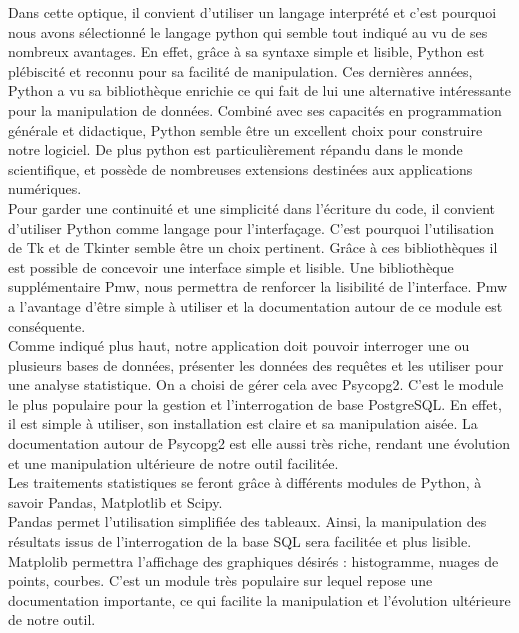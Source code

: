 \documentclass[a4paper]{report}
\begin{document}
Dans cette optique, il convient d’utiliser un langage interprété et c’est pourquoi nous avons sélectionné le langage python qui semble tout indiqué au vu de ses nombreux avantages. En effet, grâce à sa syntaxe simple et lisible, Python est plébiscité et reconnu pour sa facilité de manipulation. Ces dernières années, Python a vu sa bibliothèque enrichie ce qui fait de lui une alternative intéressante pour la manipulation de données. Combiné avec ses capacités en programmation générale et didactique, Python semble être un excellent choix pour construire notre logiciel. De plus python est particulièrement répandu dans le monde scientifique, et possède de nombreuses extensions destinées aux applications numériques.\\

Pour garder une continuité et une simplicité dans l'écriture du code, il convient d'utiliser Python comme langage pour l'interfaçage. C'est pourquoi l'utilisation de Tk et de Tkinter semble être un choix pertinent. Grâce à ces bibliothèques il est possible de concevoir une interface simple et lisible. Une bibliothèque supplémentaire Pmw, nous permettra de renforcer la lisibilité de l'interface. Pmw a l'avantage d'être simple à utiliser et la documentation autour de ce module est conséquente.\\

Comme indiqué plus haut, notre application doit pouvoir interroger une ou plusieurs bases de données, présenter les données des requêtes et les utiliser pour une analyse statistique. On a choisi de gérer cela avec Psycopg2. C'est le module le plus populaire pour la gestion et l'interrogation de base PostgreSQL. En effet, il est simple à utiliser, son installation est claire et sa manipulation aisée. La documentation autour de Psycopg2 est elle aussi très riche, rendant une évolution et une manipulation ultérieure de notre outil facilitée.\\

Les traitements statistiques se feront grâce à différents modules de Python, à savoir Pandas, Matplotlib et Scipy.\\
Pandas permet l'utilisation simplifiée des tableaux. Ainsi, la manipulation des résultats issus de l'interrogation de la base SQL sera facilitée et plus lisible.\\
Matplolib permettra l'affichage des graphiques désirés : histogramme, nuages de points, courbes. C'est un module très populaire sur lequel repose une documentation importante, ce qui facilite la manipulation et l'évolution ultérieure de notre outil.\\
\end{document}
